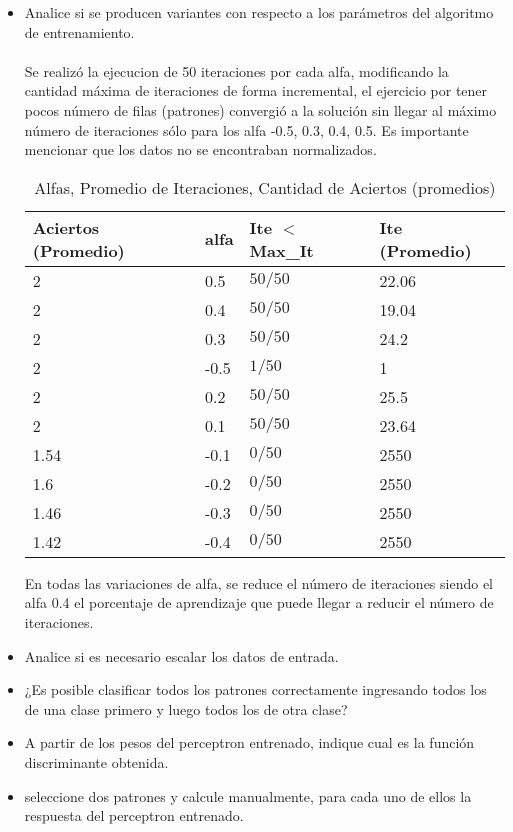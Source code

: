 \documentclass[8.5pt,twoside,twocolumn]{article}
\begin{document}
\begin{itemize}
    \item Analice si se producen variantes con respecto a los par\'ametros del algoritmo de entrenamiento. 
        \\
        \\
        Se realiz\'o la ejecucion de 50 iteraciones por cada alfa, modificando la cantidad m\'axima de iteraciones
        de forma incremental, el ejercicio por tener pocos n\'umero de filas (patrones) convergi\'o a la soluci\'on
 sin llegar al m\'aximo n\'umero de iteraciones s\'olo para los alfa -0.5, 0.3, 0.4, 0.5. Es importante mencionar que 
los datos no se encontraban normalizados.
        
        \begin{table}[h]
        \small
        \caption{ Alfas, Promedio de Iteraciones, Cantidad de Aciertos (promedios) }
        \label{tbl:example}
        \begin{tabular*}{0.5\textwidth}{@{\extracolsep{\fill}}llll}
        \hline
        Aciertos (Promedio) & alfa & Ite $<$ Max\_It & Ite (Promedio)\\
        \hline
        2 & 0.5 & $50/50$ & 22.06 \\
        2 & 0.4& $50/50$ & 19.04  \\
        2 & 0.3 & $50/50$ & 24.2 \\
        2 & -0.5 & $1/50$ & 1 \\
        2 & 0.2 & $50/50$ & 25.5 \\
        2 & 0.1 & $50/50$ & 23.64 \\
        1.54 & -0.1 & $0/50$ & 2550 \\
        1.6 & -0.2 & $0/50$ & 2550 \\
        1.46 & -0.3 & $0/50$ & 2550 \\
        1.42 & -0.4 & $0/50$ & 2550 \\
        \hline
        \end{tabular*}
        \end{table}
        En todas las variaciones de alfa, se reduce el n\'umero de iteraciones siendo el alfa 0.4 el porcentaje de 
        aprendizaje que puede llegar a reducir el  n\'umero de iteraciones.

    \item Analice si es necesario escalar los datos de entrada. 
    \item ¿Es posible clasificar todos los patrones correctamente ingresando todos los de una clase primero y luego todos los de otra clase?
    \item A partir de los pesos del perceptron entrenado, indique cual es la funci\'on discriminante obtenida.
    \item seleccione dos patrones y calcule manualmente, para cada uno de ellos la respuesta del perceptron entrenado.
\end{itemize}
\end{document}
